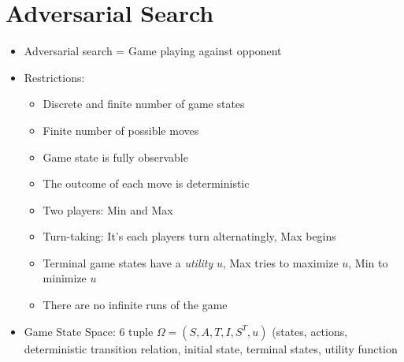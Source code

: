 \documentclass{scrartcl}
\begin{document}
\section{Adversarial Search}
\begin{itemize}
    \item
        Adversarial search = Game playing against opponent
    \item
        Restrictions:
        \begin{itemize}
            \item
                Discrete and finite number of game states
            \item
                Finite number of possible moves
            \item
                Game state is fully observable
            \item
                The outcome of each move is deterministic
            \item
                Two players: Min and Max
            \item
                Turn-taking: It's each players turn alternatingly, Max begins
            \item
                Terminal game states have a \textit{utility} $u$, Max tries to maximize $u$, Min to minimize $u$
            \item
                There are no infinite runs of the game
        \end{itemize}
    \item
        Game State Space: 6 tuple $\Omega = (S, A, T, I, S^T, u)$ (states, actions, deterministic transition relation, initial state, terminal states, utility function
\end{itemize}
\end{document}
